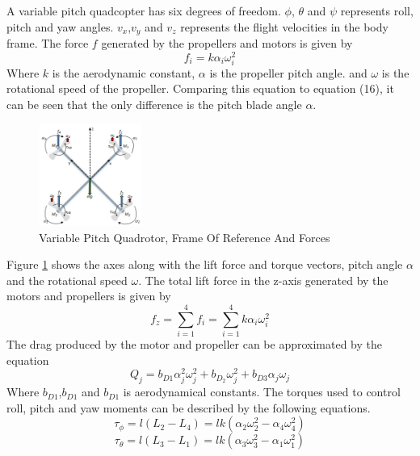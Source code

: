 A variable pitch quadcopter has six degrees of freedom. $\phi$, $\theta$ and $\psi$ represents roll, pitch and yaw angles. $v_x$,$v_y$ and $v_z$ represents the flight velocities in the body frame. The force $f$ generated by the propellers and motors is given by
\begin{equation}
    f_{i} = k\alpha_i\omega_i^2
\end{equation}
Where $k$ is the aerodynamic constant,  $\alpha$ is the propeller pitch angle. and $\omega$ is the rotational speed of the propeller. Comparing this equation to equation (16), it can be seen that the only difference is the pitch blade angle $\alpha$.
\begin{figure}[H]
    \centering
    \includegraphics[width = 0.3\textwidth]{VAPIQ-PICTURES/MMVPQ.jpg}
    \caption{Variable Pitch Quadrotor, Frame Of Reference And Forces}
    \label{fig:ControllInputs}
\end{figure}
\noindent
Figure \ref{fig:ControllInputs} shows the axes along with the lift force and torque vectors, pitch angle $\alpha$ and the rotational speed $\omega$. The total lift force in the z-axis generated by the motors and propellers is given by
\begin{equation}
   f_{z} = \sum_{i=1}^{4} f_{i} = \sum_{i=1}^{4} k\alpha_i\omega_i^2
\end{equation}
The drag produced by the motor and propeller can be approximated by the equation
\begin{equation}
   Q_j = b_{D1}\alpha_j^2\omega_j^2 + b_D_2\omega_j^2 + b_{D3}\alpha_j\omega_j
\end{equation}
Where $b_{D1}$,$b_{D1}$ and $b_{D1}$ is aerodynamical constants. The torques used to control roll, pitch and yaw moments can be described by the following equations.
\begin{equation}
   \tau_\phi = l(L_2-L_4) =lk(\alpha_2\omega_2^2-\alpha_4\omega_4^2)
\end{equation}
\begin{equation}
   \tau_\theta = l(L_3-L_1) = lk(\alpha_3\omega_3^2-\alpha_1\omega_1^2)
\end{equation}
